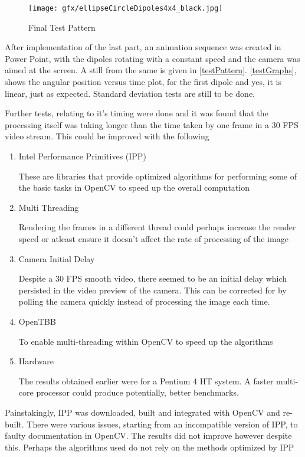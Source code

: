 			\begin{figure}[bth]
				\begin{center}
					\texttt{[image: gfx/ellipseCircleDipoles4x4\_black.jpg]}
				\end{center}
			\caption[Final Test Pattern]{Final Test Pattern}
			\label{testPattern}
			\end{figure}

			After implementation of the last part, an animation sequence was created in Power Point, with the dipoles rotating with a constant speed and the camera was aimed at the screen. A still from the same is given in \autoref{testPattern}. \autoref{testGraphs}, shows the angular position versus time plot, for the first dipole and yes, it is linear, just as expected. Standard deviation tests are still to be done.
			\par
			Further tests, relating to it's timing were done and it was found that the processing itself was taking longer than the time taken by one frame in a 30 FPS video stream. This could be improved with the following
			\begin{enumerate}
				\item Intel Performance Primitives (IPP)
					\par
					These are libraries that provide optimized algorithms for performing some of the basic tasks in OpenCV to speed up the overall computation
				\item Multi Threading
					\par
					Rendering the frames in a different thread could perhaps increase the render speed or atleast ensure it doesn't affect the rate of processing of the image
				\item Camera Initial Delay
					\par
					Despite a 30 FPS smooth video, there seemed to be an initial delay which persisted in the video preview of the camera. This can be corrected for by polling the camera quickly instead of processing the image each time.
				\item OpenTBB
					\par
					To enable multi-threading within OpenCV to speed up the algorithms
				\item Hardware
					\par
					The results obtained earlier were for a Pentium 4 HT system. A faster multi-core processor could produce potentially, better benchmarks.
			\end{enumerate}
			Painstakingly, IPP was downloaded, built and integrated with OpenCV and re-built. There were various issues, starting from an incompatible version of IPP, to faulty documentation in OpenCV. The results did not improve however despite this. Perhaps the algorithms used do not rely on the methods optimized by IPP
